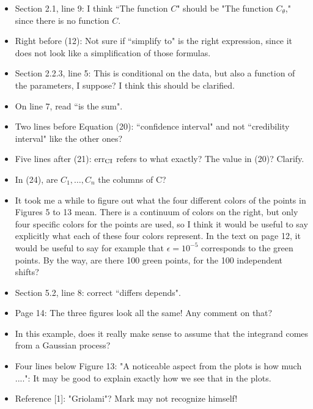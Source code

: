 \documentclass{amsart}
\begin{document}
\begin{itemize}
    \item Section 2.1, line 9: I think ``The function $C$" should be "The function $C_\theta$," since there is no function $C$.  

\item Right before (12):  Not sure if ``simplify to" is the right expression, since it does not look like a simplification of those formulas.  

\item Section 2.2.3, line 5: This is conditional on the data, but also a function of the parameters, I suppose?  I think this should be clarified.  

\item On line 7, read ``is the sum". 

\item Two lines before Equation (20): ``confidence interval" and not ``credibility interval" like the other ones?  

\item Five lines after (21): err$_{\rm CI}$ refers to what exactly? The value in (20)?  Clarify.  

\item In (24), are $C_1,\dots,C_n$ the columns of C?  

\item It took me a while to figure out what the four different colors of the points in Figures 5 to 13 mean.  There is a continuum of colors on the right, but only four specific colors for the points are used, so I think it would be useful to say explicitly what each of these four colors  represent.  In the text on page 12, it would be useful to say for example that $\epsilon = 10^{-5}$ corresponds to the green points.   By the way, are there 100 green points, for the 100 independent shifts?

\item Section 5.2, line 8: correct ``differs depends". 

\item Page 14: The three figures look all the same!  Any comment on that?

\item In this example, does it really make sense to assume that the integrand comes from a Gaussian process?

\item Four lines below Figure 13:  "A noticeable aspect from the plots is how much ....":  It may be good to explain exactly how we see that in the plots.

\item Reference [1]:  "Griolami"?   Mark may not recognize himself!  

\end{itemize}
\end{document}
